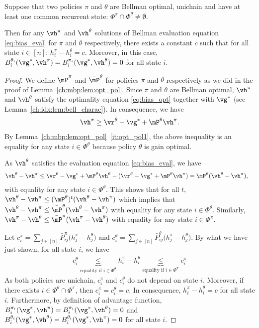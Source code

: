 \begin{lem}
    \label{ch:mbp:lem:equi_bias}
    Suppose that two policies $\pi$ and $\theta$ are Bellman optimal, unichain and have at least one common recurrent state: $\Phi^\pi\cap\Phi^\theta\neq\emptyset$.
    
    Then for any $\vh^\pi$ and $\vh^\theta$ solutions of Bellman evaluation equation \eqref{eq:bias_eval} for $\pi$ and $\theta$ respectively, there exists a constant $c$ such that for all state $i\in[n]$: $h^\pi_i -h^\theta_i =c$. Moreover, in this case, ${B_i^{\theta_i}(\vg^*, \vh^\pi)=B_i^{\pi_i}(\vg^*, \vh^\theta)=0}$ for all state $i$.
\end{lem}
\begin{proof}
    We define $\bar{\mP}^\pi$ and $\bar{\mP}^\theta$ for policies $\pi$ and $\theta$ respectively as we did in the proof of Lemma~\ref{ch:mbp:lem:opt_pol}.
    Since $\pi$ and $\theta$ are Bellman optimal, $\vh^\pi$ and $\vh^\theta$ satisfy the optimality equation \eqref{eq:bias_opt} together with $\vg^*$ (see Lemma~\ref{ch:idx:lem:bell_charac}).
    In consequence, we have
    \begin{align*}
        \vh^\pi \ge \vr^\theta -\vg^* +\mP^\theta\vh^\pi.
    \end{align*}
    By Lemma~\ref{ch:mbp:lem:opt_pol}~\ref{it:opt_pol1}, the above inequality is an equality for any state $i\in\Phi^\theta$ because policy $\theta$ is gain optimal.

    As $\vh^\theta$ satisfies the evaluation equation \eqref{eq:bias_eval}, we have
    \begin{align*}
        \vh^\theta -\vh^\pi &\le \vr^\theta -\vg^* +\mP^\theta\vh^\theta -(\vr^\theta -\vg^* +\mP^\theta\vh^\pi) = \mP^\theta(\vh^\theta -\vh^\pi),
    \end{align*}
    with equality for any state $i\in\Phi^\theta$.
    This shows that for all $t$, $\vh^\theta -\vh^\pi\le (\mP^\theta)^t(\vh^\theta -\vh^\pi)$ which implies that $\vh^\theta -\vh^\pi\le \bar{\mP}^\theta(\vh^\theta -\vh^\pi)$ with equality for any state $i\in\Phi^\theta$.
    Similarly, $\vh^\pi -\vh^\theta \le \bar{\mP}^\pi(\vh^\pi -\vh^\theta)$ with equality for any state $i\in\Phi^\pi$.

    Let $c^\pi_i=\sum_{j\in[n]}\bar{P}^\pi_{ij}\Big(h^\pi_j-h^\theta_j\Big)$ and $c^\theta_i=\sum_{j\in[n]}\bar{P}^\theta_{ij}\Big(h^\pi_j-h^\theta_j\Big)$.
    By what we have just shown, for all state $i$, we have
    \begin{align*}
        c^\theta_i \underbrace{\le}_{\text{equality if $i\in\Phi^\theta$}} h^\pi_i-h^\theta_i \underbrace{\le}_{\text{equality if $i\in\Phi^\pi$}} c^\pi_i
    \end{align*}
    As both policies are unichain, $c^\pi_i$ and $c^\theta_i$ do not depend on state $i$.
    Moreover, if there exists $i\in\Phi^\theta\cap\Phi^\pi$, then $c^\pi_i=c^\theta_i = c$. In consequence,  $h^\pi_i-h^\theta_i=c$ for all state $i$. 
    Furthermore, by definition of advantage function, $B_i^{\pi_i}(\vg^*, \vh^\pi)=B_i^{\pi_i}(\vg^*, \vh^\theta)=0$ and $B_i^{\theta_i}(\vg^*, \vh^\theta)=B_i^{\theta_i}(\vg^*, \vh^\pi)=0$ for all state $i$.
\end{proof}

